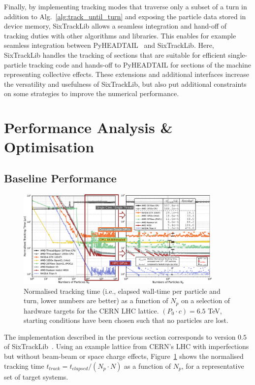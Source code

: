 \documentclass[a4paper,
               refpage,       %
               keeplastbox,   %
               ]{jacow}
\begin{document}
Finally, by implementing tracking modes that traverse only a subset of a turn in addition to Alg.~\ref{alg:track_until_turn} and exposing the particle data stored in device memory, SixTrackLib allows a seamless integration and hand-off of tracking duties with other algorithms and libraries. 
This enables for example seamless integration between  PyHEADTAIL~\cite{pyheadtail-repo-2021} and SixTrackLib. Here, SixTrackLib handles the tracking of sections that are suitable for efficient single-particle tracking code and hands-off to PyHEADTAIL for sections of the machine representing collective effects.
These extensions and additional interfaces increase the versatility and usefulness of SixTrackLib, but also put additional constraints on some strategies to improve the numerical performance.


\section{Performance Analysis \& Optimisation}
\subsection{Baseline Performance}
\begin{figure}[h!t]
    \centering
    \includegraphics*[width=0.9\textwidth]{fig_performance_baseline}
    \caption{Normalised tracking time (i.e., elapsed wall-time per particle and turn, lower numbers are better) as a function of $N_{p}$ on a selection of hardware targets for the CERN LHC lattice. $(P_0\cdot c) = 6.5$ TeV, starting conditions have been chosen such that no particles are lost.}
    \label{fig:baseline_performance}
\end{figure}
The implementation described in the previous section corresponds to version $0.5$ of SixTrackLib~\cite{sixtracklib-repo-2021}. Using an example lattice from CERN's LHC with imperfections but without beam-beam or space charge effects, Figure~\ref{fig:baseline_performance} shows the normalised tracking time $t_{track} = t_{elapsed}/(N_{p}\cdot N)$ as a function of $N_{p}$,  for a representative set of target systems. 
\end{document}
